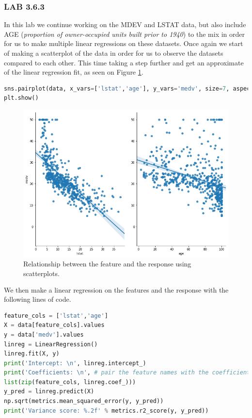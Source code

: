 \subsubsection*{LAB 3.6.3}
In this lab we continue working on the MDEV and LSTAT data, but also include AGE (\textit{proportion of owner-occupied units built prior to 1940}) to the mix in order for us to make multiple linear regressions on these datasets. Once again we start of making a scatterplot of the data in order for us to observe the datasets compared to each other. This time taking a step further and get an approximate of the linear regression fit, as seen on Figure \ref{fig:bostonPairplotMdevLstatAge}.

\begin{lstlisting}[language=Python]
sns.pairplot(data, x_vars=['lstat','age'], y_vars='medv', size=7, aspect=0.7, kind='reg')
plt.show()
\end{lstlisting}

\begin{figure}[h]
	\centering
	\includegraphics[scale=0.4]{regression/multipleLinearRegression/fig/bostonPairplotMdevLstatAge.png}
	\caption{Relationship between the feature and the response using scatterplots.}
	\label{fig:bostonPairplotMdevLstatAge}
\end{figure}

We then make a linear regression on the features and the response with the following lines of code.

\begin{lstlisting}[language=Python]
feature_cols = ['lstat','age']
X = data[feature_cols].values
y = data['medv'].values
linreg = LinearRegression()
linreg.fit(X, y)
print('Intercept: \n', linreg.intercept_)
print('Coefficients: \n', # pair the feature names with the coefficients
list(zip(feature_cols, linreg.coef_)))
y_pred = linreg.predict(X)
np.sqrt(metrics.mean_squared_error(y, y_pred))
print('Variance score: %.2f' % metrics.r2_score(y, y_pred))
\end{lstlisting}

